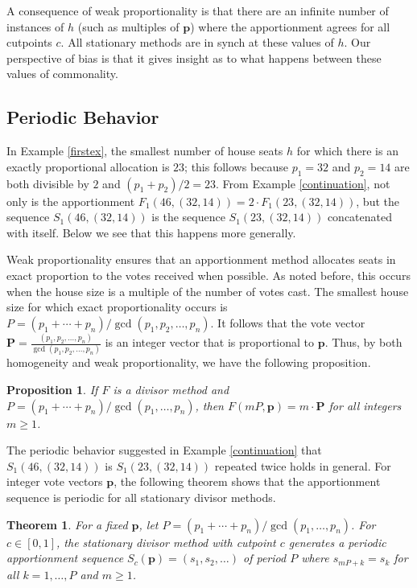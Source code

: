\documentclass[pdflatex,sn-mathphys-num]{sn-jnl}
\theoremstyle{thmstyleone}%
\newtheorem{theorem}{Theorem}%
\newtheorem{proposition}{Proposition}%
\theoremstyle{thmstyletwo}%
\theoremstyle{thmstylethree}%
\begin{document}
 A consequence of weak proportionality is that there are an infinite number of instances of $h$ (such as multiples of $\mathbf p$) where the apportionment agrees for all cutpoints $c$.  All stationary methods are in synch at these values of $h$. Our perspective of bias is that it gives insight as to what happens between these values of commonality.  
  
 
 \subsection{Periodic Behavior}

 In Example \ref{firstex}, the smallest number of house seats $h$ for which there is an exactly proportional allocation is $23$; this follows because $p_1=32$ and $p_2=14$ are both divisible by $2$ and $(p_1+p_2)/2 = 23$.  From Example \ref{continuation}, not only is the apportionment $F_1(46, (32,14)) = 2 \cdot F_1(23, (32,14))$, but the sequence $S_1(46, (32,14))$ is the sequence $S_1(23, (32,14))$ concatenated with itself.  Below we see that this happens more generally.
 
 
Weak proportionality ensures that an apportionment method allocates seats in exact proportion to the votes received when possible. As noted before, this occurs when the house size is a multiple of the number of votes cast.  The smallest house size for which exact proportionality occurs is  $P = (p_1 + \cdots + p_n)/\gcd(p_1, p_2, \dots, p_n)$. It follows that the vote vector $\mathbf P =  \frac{(p_1, p_2, \dots, p_n)}{\gcd(p_1, p_2, \dots, p_n)}$ is an integer vector that is proportional to $\mathbf p$. Thus, by both homogeneity and weak proportionality, we have the following proposition. 

\begin{proposition} \label{prop:weakprop} If $F$ is a divisor method and $P = (p_1+ \cdots + p_n)/\gcd(p_1, \ldots, p_n)$, then $F( mP, \mathbf p) = m \cdot \mathbf P$ for all  integers $m \ge 1$.
\end{proposition}

The periodic behavior suggested in Example \ref{continuation} that $S_1(46, (32,14))$ is $S_1(23, (32,14))$ repeated twice holds in general.  For integer vote vectors $\mathbf p$, the following theorem shows that the apportionment sequence is periodic for all stationary divisor methods.

\begin{theorem} \label{periodic} For a fixed $\mathbf p$, let $P=(p_1 + \cdots + p_n)/ \gcd(p_1, \dots, p_n)$.  For $c \in [0,1]$, the stationary divisor method with cutpoint $c$ generates a periodic apportionment sequence $S_c(\mathbf p) = (s_1, s_2, \ldots)$ of period $P$ where $s_{mP+k} = s_k$ for all $k=1, \ldots, P$ and $m\ge 1$. \end{theorem}
\end{document}
